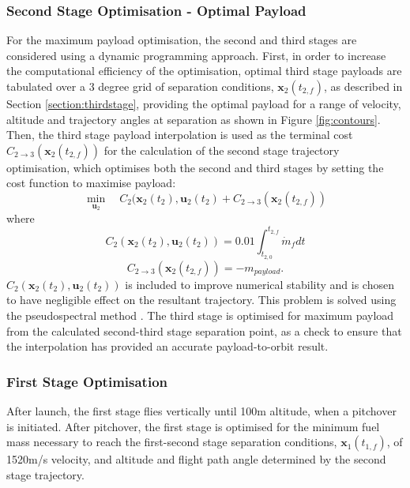 \documentclass[]{aiaa-tc}
\begin{document}
	 	 \subsubsection{Second Stage Optimisation - Optimal Payload}
	 For the maximum payload optimisation, the second and third stages are considered using a dynamic programming approach. First, in order to increase the computational efficiency of the optimisation, optimal third stage payloads are tabulated  over a 3 degree grid of separation conditions, $\textbf{x}_2(t_{2,f})$, as described in Section \ref{section:thirdstage}, providing the optimal payload for a range of velocity, altitude and trajectory angles at separation as shown in Figure \ref{fig:contours}. Then, the third stage payload interpolation is used as the terminal cost $C_{2 \rightarrow 3}(\textbf{x}_2(t_{2,f}))$ for the calculation of the second stage trajectory optimisation, which optimises both the second and third stages by setting the cost function to maximise payload:
	  \begin{equation}
	  \min\limits_{\textbf{u}_2} \quad C_2(\textbf{x}_{2}(t_2),\textbf{u}_{2}(t_2) + C_{2 \rightarrow 3}(\textbf{x}_2 (t_{2,f}))
	  \end{equation}
	  where
	  \begin{equation}
	  C_2(\textbf{x}_{2}(t_2),\textbf{u}_{2}(t_2)) = 0.01\int_{t_{2,0}}^{t_{2,f}}\dot{m}_{f} dt
	  \end{equation}
	  \begin{equation}
	  C_{2 \rightarrow 3}(\textbf{x}_2(t_{2,f})) = -m_{payload}.
	  \end{equation}
	   $C_{2}(\textbf{x}_{2}(t_2),\textbf{u}_{2}(t_2))$ is included to improve numerical stability and is chosen to have negligible effect on the resultant trajectory.
	 This problem is solved using the pseudospectral method \cite{Ross2004}. 
	 The third stage is optimised for maximum payload from the calculated second-third stage separation point, as a check to ensure that the interpolation has provided an accurate payload-to-orbit result. 
	 
  

\subsubsection{First Stage Optimisation}
After launch, the first stage flies vertically until 100m altitude, when a pitchover is initiated. 
After pitchover, the first stage is optimised for the minimum fuel mass necessary to reach the first-second stage separation conditions, $\textbf{x}_1(t_{1,f})$, of 1520m/s velocity, and altitude and flight path angle determined by the second stage trajectory. 
\end{document}
